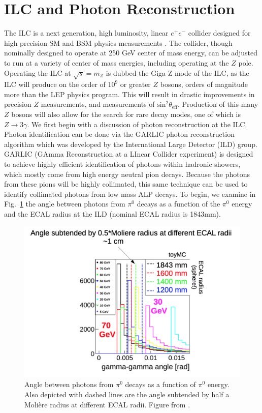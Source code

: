 \documentclass[aps,onecolumn,twoside,secnumarabic,12pt,balancelastpage,amsmath,amssymb,nofootinbib,hyperref=pdftex]{revtex4}
\begin{document}
\section{ILC and Photon Reconstruction}\label{section:ilcphotons}
The ILC is a next generation, high luminosity, linear $e^{+}e^{-}$ collider designed for high precision SM and BSM physics measurements \cite{Bambade:2019fyw, Erler:2000jg, Baer:2013cma}. The collider, though nominally designed to operate at 250 GeV center of mass energy, can be adjusted to run at a variety of center of mass energies, including operating at the $Z$ pole. Operating the ILC at $\sqrt{s} = m_{Z}$ is dubbed the Giga-Z mode of the ILC, as the ILC will produce on the order of $10^{9}$ or greater $Z$ bosons, orders of magnitude more than the LEP physics program. This will result in drastic improvements in precision $Z$ measurements, and measurements of $\text{sin}^{2}\theta_{\text{eff}}$. Production of this many $Z$ bosons will also allow for the search for rare decay modes, one of which is $Z\rightarrow 3\gamma$.
\vskip 0.12in
We first begin with a discussion of photon reconstruction at the ILC. Photon identification can be done via the GARLIC photon reconstruction algorithm \cite{Jeans:2012jj} which was developed by the International Large Detector (ILD) group. GARLIC (GAmma Reconstruction at a LInear Collider experiment) is designed to achieve highly efficient identification of photons within hadronic showers, which mostly come from high energy neutral pion decays. Because the photons from these pions will be highly collimated, this same technique can be used to identify collimated photons from low mass ALP decays. To begin, we examine in Fig.~\ref{fig:photon_angles} the angle between photons from $\pi^{0}$ decays as a function of the $\pi^{0}$ energy and the ECAL radius at the ILD (nominal ECAL radius is 1843mm).
\begin{figure}[htbp]
\begin{center}
\includegraphics[width=12cm]{photon_angles.png}
\caption{Angle between photons from $\pi^{0}$ decays as a function of $\pi^{0}$ energy. Also depicted with dashed lines are the angle subtended by half a Moli\`ere radius at different ECAL radii. Figure from \cite{Jeans:2012jj}.}
\label{fig:photon_angles}
\end{center}
\end{figure}
\end{document}
